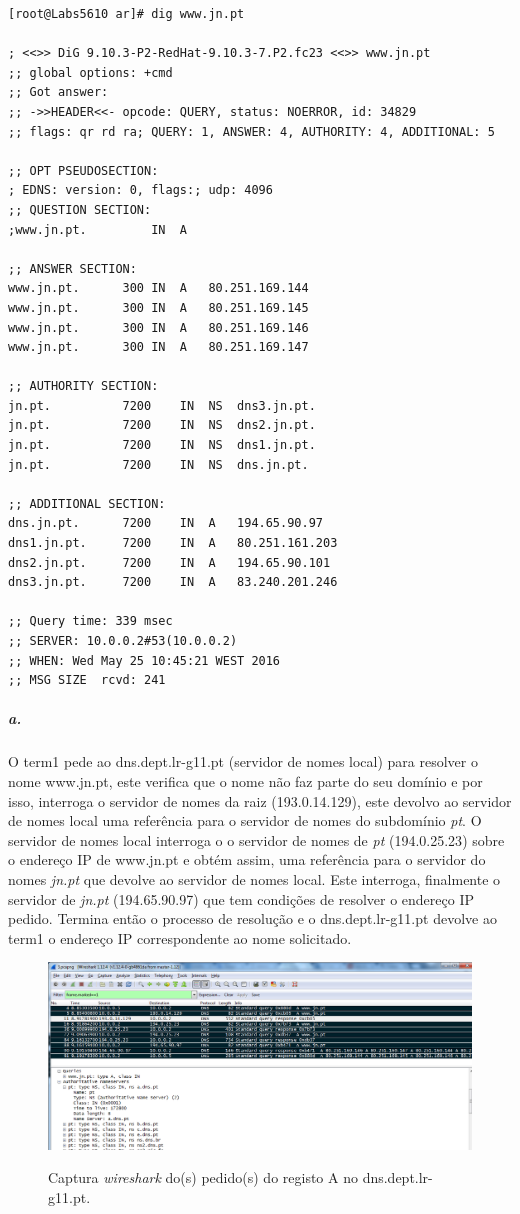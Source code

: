 \begin{verbatim}
[root@Labs5610 ar]# dig www.jn.pt

; <<>> DiG 9.10.3-P2-RedHat-9.10.3-7.P2.fc23 <<>> www.jn.pt
;; global options: +cmd
;; Got answer:
;; ->>HEADER<<- opcode: QUERY, status: NOERROR, id: 34829
;; flags: qr rd ra; QUERY: 1, ANSWER: 4, AUTHORITY: 4, ADDITIONAL: 5

;; OPT PSEUDOSECTION:
; EDNS: version: 0, flags:; udp: 4096
;; QUESTION SECTION:
;www.jn.pt.			IN	A

;; ANSWER SECTION:
www.jn.pt.		300	IN	A	80.251.169.144
www.jn.pt.		300	IN	A	80.251.169.145
www.jn.pt.		300	IN	A	80.251.169.146
www.jn.pt.		300	IN	A	80.251.169.147

;; AUTHORITY SECTION:
jn.pt.			7200	IN	NS	dns3.jn.pt.
jn.pt.			7200	IN	NS	dns2.jn.pt.
jn.pt.			7200	IN	NS	dns1.jn.pt.
jn.pt.			7200	IN	NS	dns.jn.pt.

;; ADDITIONAL SECTION:
dns.jn.pt.		7200	IN	A	194.65.90.97
dns1.jn.pt.		7200	IN	A	80.251.161.203
dns2.jn.pt.		7200	IN	A	194.65.90.101
dns3.jn.pt.		7200	IN	A	83.240.201.246

;; Query time: 339 msec
;; SERVER: 10.0.0.2#53(10.0.0.2)
;; WHEN: Wed May 25 10:45:21 WEST 2016
;; MSG SIZE  rcvd: 241
\end{verbatim}

\subparagraph{a.}
O \textsf{term1} pede ao \textsf{dns.dept.lr-g11.pt} (servidor de nomes local) 
para resolver o nome \textsf{www.jn.pt}, este verifica que o nome não faz
parte do seu domínio e por isso, interroga o servidor de nomes da raiz 
(\textsf{193.0.14.129}), este devolvo ao servidor de nomes local uma 
referência para o servidor de nomes do subdomínio \textsf{\textit{pt}}. 
O servidor de nomes local interroga o o servidor de nomes de \textsf{\textit{pt}}
(\textsf{194.0.25.23}) sobre o endereço IP de \textsf{www.jn.pt} e obtém assim, 
uma referência para o servidor do nomes \textsf{\textit{jn.pt}} que devolve
ao servidor de nomes local. Este interroga, finalmente o servidor de 
\textsf{\textit{jn.pt}} (\textsf{194.65.90.97}) que tem condições de resolver
o endereço IP pedido. Termina então o processo de resolução e o 
\textsf{dns.dept.lr-g11.pt} devolve ao \textsf{term1} o endereço IP correspondente
ao nome solicitado.

\begin{figure}[h]
\centering
\includegraphics[width=1\textwidth, height=0.35\textheight]{3a_cap.png}
\label{fig:2-capturaWireshark}
\caption{Captura \emph{wireshark} do(s) pedido(s) do registo A no \textsf{dns.dept.lr-g11.pt}.}
\end{figure}


